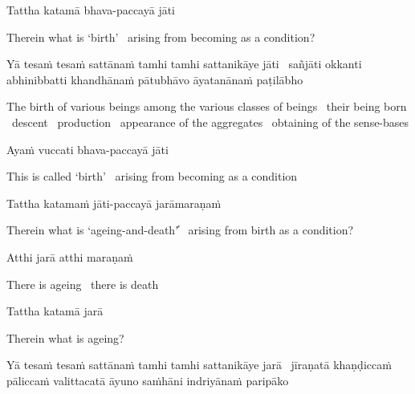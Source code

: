 Tattha katamā bhava-paccayā jāti

\begin{english}
  Therein what is `birth' \breathmark\ arising from becoming as a condition?
\end{english}

\begin{pali-hang}
  Yā tesaṁ tesaṁ sattānaṁ tamhi tamhi sattanikāye jāti \breathmark\ sañjāti okkanti abhinibbatti khandhānaṁ pātubhāvo āyatanānaṁ paṭilābho\makeatletter\hyperlink{endnote83-appendix}\makeatother
\end{pali-hang}

\begin{english-hang-verses}
  The birth of various beings among the various classes of beings \breathmark\ their being born \breathmark\ descent \breathmark\ production \breathmark\ appearance of the aggregates \breathmark\ obtaining of the sense-bases
\end{english-hang-verses}

Ayaṁ vuccati bhava-paccayā jāti

\begin{english}
  This is called `birth' \breathmark\ arising from becoming as a condition
\end{english}

Tattha katamaṁ jāti-paccayā jarāmaraṇaṁ

\begin{english}
Therein what is `ageing-and-death'̓ \breathmark\ arising from birth as a condition?
\end{english}

Atthi jarā atthi maraṇaṁ

\begin{english}
There is ageing \breathmark\ there is death
\end{english}

Tattha katamā jarā

\begin{english}
Therein what is ageing?
\end{english}

\begin{pali-hang}
Yā tesaṁ tesaṁ sattānaṁ tamhi tamhi sattanikāye jarā \breathmark\ jīraṇatā khaṇḍiccaṁ pāliccaṁ valittacatā āyuno saṁhāni indriyānaṁ paripāko
\end{pali-hang}

